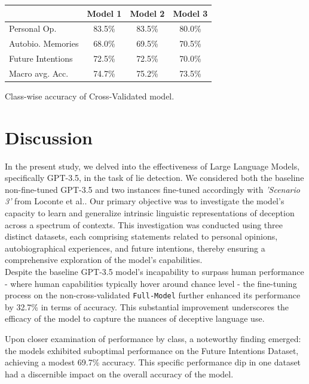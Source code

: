 \documentclass[10pt,twocolumn,letterpaper]{article}
\begin{document}
\begin{center}
    \begin{tabular}{lccc}
      \toprule
      & Model 1 & Model 2 & Model 3 \\
      \midrule
      Personal Op. & 83.5\% & 83.5\% & 80.0\% \\
      Autobio. Memories & 68.0\% & 69.5\% & 70.5\% \\
      Future Intentions & 72.5\% & 72.5\% & 70.0\% \\
      \midrule
      Macro avg. Acc. & 74.7\% & 75.2\% & 73.5\% \\
      \bottomrule
    \end{tabular}
\end{center}

\begin{center}
    \small {Class-wise accuracy of Cross-Validated model.}
\end{center}

\section{Discussion}

In the present study, we delved into the effectiveness of Large Language Models, specifically GPT-3.5, in the task of lie detection.
We considered both the baseline non-fine-tuned GPT-3.5 and two instances fine-tuned accordingly with \textit{'Scenario 3'} from Loconte et al.\cite{Loconte}. 
Our primary objective was to investigate the model's capacity to learn and generalize intrinsic linguistic representations of deception 
across a spectrum of contexts. This investigation was conducted using three distinct datasets, each comprising 
statements related to personal opinions, autobiographical experiences, and future intentions, thereby ensuring 
a comprehensive exploration of the model's capabilities. \\

Despite the baseline GPT-3.5 model's incapability to surpass human performance - where human capabilities 
typically hover around chance level - the fine-tuning process on the non-cross-validated \texttt{Full-Model} further enhanced its performance by 32.7\% in terms 
of accuracy.
This substantial improvement underscores the efficacy of the model to capture the nuances of deceptive language use.

Upon closer examination of performance by class, a noteworthy finding emerged: the models exhibited 
suboptimal performance on the Future Intentions Dataset, achieving a modest 69.7\% accuracy. 
This specific performance dip in one dataset had a discernible impact on the overall accuracy of the model. \\
\end{document}
